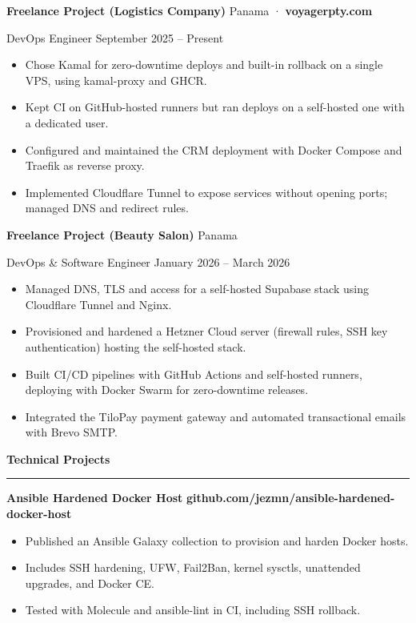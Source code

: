 \documentclass[
]{article}
\newcommand{\sect}[1]{\vspace{4pt}\noindent\textbf{#1}\par\vspace{-2pt}\noindent\rule{\linewidth}{0.4pt}\par\vspace{2pt}}
\begin{document}
\textbf{Freelance Project (Logistics Company)} \hfill Panama · \textbf{voyagerpty.com}

DevOps Engineer \hfill September 2025 -- Present
\vspace*{10pt}

\begin{itemize}
\item
  Chose Kamal for zero-downtime deploys and built-in rollback on a single VPS,
  using kamal-proxy and GHCR.
\item
  Kept CI on GitHub-hosted runners but ran deploys on a self-hosted one with a
  dedicated user.
\item
  Configured and maintained the CRM deployment with Docker Compose and Traefik as
  reverse proxy.
\item
  Implemented Cloudflare Tunnel to expose services without opening ports;
  managed DNS and redirect rules.
\end{itemize}
\vspace*{10pt}

\textbf{Freelance Project (Beauty Salon)} \hfill Panama

DevOps \& Software Engineer \hfill January 2026 -- March 2026
\vspace*{10pt}

\begin{itemize}
\item
  Managed DNS, TLS and access for a self-hosted Supabase stack using
  Cloudflare Tunnel and Nginx.
\item
  Provisioned and hardened a Hetzner Cloud server (firewall rules, SSH key
  authentication) hosting the self-hosted stack.
\item
  Built CI/CD pipelines with GitHub Actions and self-hosted runners, deploying with Docker Swarm
  for zero-downtime releases.
\item
  Integrated the TiloPay payment gateway and automated transactional emails with Brevo SMTP.
\end{itemize}
\vspace*{10pt}

\newpage
\sect{Technical Projects}
\vspace*{10pt}
\textbf{Ansible Hardened Docker Host} \hfill \textbf{github.com/jezmn/ansible-hardened-docker-host}

\begin{itemize}
\item
  Published an Ansible Galaxy collection to provision and harden Docker
  hosts.
\item
  Includes SSH hardening, UFW, Fail2Ban, kernel sysctls, unattended
  upgrades, and Docker CE.
\item
  Tested with Molecule and ansible-lint in CI, including SSH rollback.
\end{itemize}
\vspace*{10pt}
\end{document}
